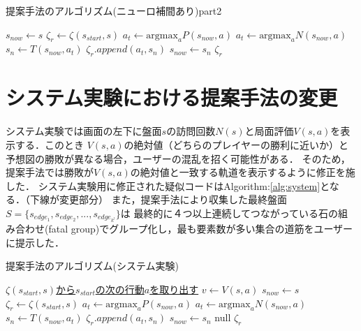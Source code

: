 \begin{algorithm}
    \caption{提案手法のアルゴリズム(ニューロ補間あり)part2}
    \label{alg:neuro-1}
    \begin{algorithmic}[1] 
        \State $s_{now} \gets s$
        \State $\zeta_r \gets \zeta(s_{start}, s)$
                \State \underline{$a_t \gets \textrm{argmax}_a P(s_{now}, a)$}
            \Else
                \State $a_t \gets \textrm{argmax}_a N(s_{now}, a)$
            \EndIf
            \State $s_n \gets T(s_{now}, a_t)$
            \State $\zeta_r.append({a_t, s_n})$
            \State $s_{now} \gets s_n$
        \EndWhile
        \Return $\zeta_r$
        \EndFunction
       
        
    \end{algorithmic}
\end{algorithm}
\section{システム実験における提案手法の変更}
\label{sec:fix}
システム実験では画面の左下に盤面$s$の訪問回数$N(s)$と局面評価$V(s, a)$を表示する．このとき
$V(s, a)$の絶対値（どちらのプレイヤーの勝利に近いか）と予想図の勝敗が異なる場合，ユーザーの混乱を招く可能性がある．
そのため，提案手法では勝敗が$V(s, a)$の絶対値と一致する軌道を表示するように修正を施した．
システム実験用に修正された疑似コードはAlgorithm:\ref{alg:system}となる．（下線が変更部分）
また，提案手法により収集した最終盤面$S=\{s_{edge_1}, s_{edge_2}, ..., s_{edge_{k^l}}\}$は
最終的に４つ以上連続してつながっている石の組み合わせ(fatal group)でグループ化し，最も要素数が多い集合の道筋をユーザーに提示した．

\begin{algorithm}
    \caption{提案手法のアルゴリズム(システム実験)}
    \label{alg:system}
    \begin{algorithmic}[1]       
        
        \State  \underline{$\zeta(s_{start}, s)$から$s_{start}$の次の行動$a$を取り出す}
        \State \underline{$v \gets V(s, a)$}
        \State $s_{now} \gets s$
        \State $\zeta_r \gets \zeta(s_{start}, s)$
                \State \underline{$a_t \gets \textrm{argmax}_a P(s_{now}, a)$}
            \Else
                \State $a_t \gets \textrm{argmax}_a N(s_{now}, a)$
            \EndIf
            \State $s_n \gets T(s_{now}, a_t)$
            \State $\zeta_r.append({a_t, s_n})$
            \State $s_{now} \gets s_n$
        \EndWhile
           \Return null
        \EndIf
        \Return $\zeta_r$
        \EndFunction
       
        
    \end{algorithmic}
\end{algorithm}
